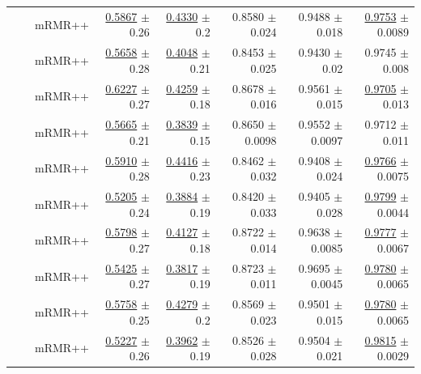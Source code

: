 \begin{longtable}{llp{}rrrrr}
 &  & mRMR++ & \underline{0.5867} {\scriptsize $\pm$ 0.26} & \underline{0.4330} {\scriptsize $\pm$ 0.2} & 0.8580 {\scriptsize $\pm$ 0.024} & 0.9488 {\scriptsize $\pm$ 0.018} & \underline{0.9753} {\scriptsize $\pm$ 0.0089} \\
 &  & mRMR++ & \underline{0.5658} {\scriptsize $\pm$ 0.28} & \underline{0.4048} {\scriptsize $\pm$ 0.21} & 0.8453 {\scriptsize $\pm$ 0.025} & 0.9430 {\scriptsize $\pm$ 0.02} & 0.9745 {\scriptsize $\pm$ 0.008} \\
 &  & mRMR++ & \underline{0.6227} {\scriptsize $\pm$ 0.27} & \underline{0.4259} {\scriptsize $\pm$ 0.18} & 0.8678 {\scriptsize $\pm$ 0.016} & 0.9561 {\scriptsize $\pm$ 0.015} & \underline{0.9705} {\scriptsize $\pm$ 0.013} \\
 &  & mRMR++ & \underline{0.5665} {\scriptsize $\pm$ 0.21} & \underline{0.3839} {\scriptsize $\pm$ 0.15} & 0.8650 {\scriptsize $\pm$ 0.0098} & 0.9552 {\scriptsize $\pm$ 0.0097} & 0.9712 {\scriptsize $\pm$ 0.011} \\
 &  & mRMR++ & \underline{0.5910} {\scriptsize $\pm$ 0.28} & \underline{0.4416} {\scriptsize $\pm$ 0.23} & 0.8462 {\scriptsize $\pm$ 0.032} & 0.9408 {\scriptsize $\pm$ 0.024} & \underline{0.9766} {\scriptsize $\pm$ 0.0075} \\
 &  & mRMR++ & \underline{0.5205} {\scriptsize $\pm$ 0.24} & \underline{0.3884} {\scriptsize $\pm$ 0.19} & 0.8420 {\scriptsize $\pm$ 0.033} & 0.9405 {\scriptsize $\pm$ 0.028} & \underline{0.9799} {\scriptsize $\pm$ 0.0044} \\
 &  & mRMR++ & \underline{0.5798} {\scriptsize $\pm$ 0.27} & \underline{0.4127} {\scriptsize $\pm$ 0.18} & 0.8722 {\scriptsize $\pm$ 0.014} & 0.9638 {\scriptsize $\pm$ 0.0085} & \underline{0.9777} {\scriptsize $\pm$ 0.0067} \\
 &  & mRMR++ & \underline{0.5425} {\scriptsize $\pm$ 0.27} & \underline{0.3817} {\scriptsize $\pm$ 0.19} & 0.8723 {\scriptsize $\pm$ 0.011} & 0.9695 {\scriptsize $\pm$ 0.0045} & \underline{0.9780} {\scriptsize $\pm$ 0.0065} \\
 &  & mRMR++ & \underline{0.5758} {\scriptsize $\pm$ 0.25} & \underline{0.4279} {\scriptsize $\pm$ 0.2} & 0.8569 {\scriptsize $\pm$ 0.023} & 0.9501 {\scriptsize $\pm$ 0.015} & \underline{0.9780} {\scriptsize $\pm$ 0.0065} \\
 &  & mRMR++ & \underline{0.5227} {\scriptsize $\pm$ 0.26} & \underline{0.3962} {\scriptsize $\pm$ 0.19} & 0.8526 {\scriptsize $\pm$ 0.028} & 0.9504 {\scriptsize $\pm$ 0.021} & \underline{0.9815} {\scriptsize $\pm$ 0.0029} \\

\end{longtable}
